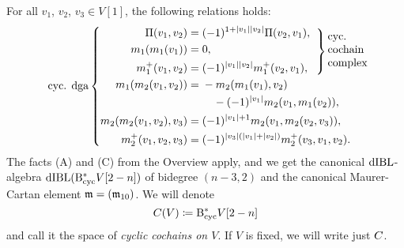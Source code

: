 \documentclass[\MainFolder/Text.tex]{subfiles}
\begin{document}
For all $v_1$, $v_2$, $v_3 \in V[1]$, the following relations holds:
\begin{equation}\label{Eq:CycDGA}{\hbadness=10000 \text{cyc. dga}\left\{ \begin{aligned} \Pair(v_1,v_2) &= (-1)^{1+ \Abs{v_1} \Abs{v_2}} \Pair(v_2, v_1), &
\mathclap{
\smash{
\raisebox{-0.58cm}{$
\hspace{-0.8cm}
\left.\begin{aligned}\mathstrut\\ \mathstrut\\ \mathstrut \end{aligned}\right\}
\text{\parbox{5em}{cyc. cochain complex}}
$}}}
\\
m_1(m_1(v_1)) &= 0, &\\
m_1^+(v_1, v_2) &= (-1)^{\Abs{v_1}\Abs{v_2}} m_1^+(v_2, v_1), &\\
 m_1(m_2(v_1,v_2)) &= \begin{multlined}[t]- m_2(m_1(v_1),v_2)  \\ - (-1)^{\Abs{v_1}} m_2(v_1,m_1(v_2)), \end{multlined} &\\
m_2(m_2(v_1, v_2), v_3) &= (-1)^{\Abs{v_1} + 1} m_2(v_1,m_2(v_2,v_3)), &\\
m_2^+(v_1, v_2, v_3) &= (-1)^{\Abs{v_3}(\Abs{v_1}+\Abs{v_2})}m_2^+(v_3, v_1, v_2).
\end{aligned}\right.}
\end{equation}
The facts (A) and (C) from the Overview apply, and we get the canonical $\mathrm{dIBL}$-algebra $\mathrm{dIBL}(\mathrm{B}_{\mathrm{cyc}}^* V[2-n])$ of bidegree $(n-3,2)$ and the canonical Maurer-Cartan element $\mathfrak{m} = (\mathfrak{m}_{10})$. We will denote
$$ C(V)\coloneqq \mathrm{B}_{\mathrm{cyc}}^* V[2-n] $$
and call it the space of \emph{cyclic cochains on $V$}. If $V$ is fixed, we will write just $C$.
\end{document}
